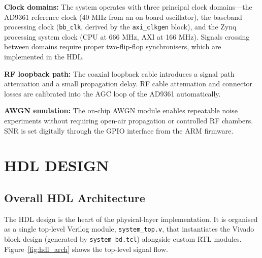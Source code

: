\documentclass[12pt, a4paper, oneside]{report}
\begin{document}
\textbf{Clock domains:} The system operates with three principal clock domains—the AD9361 reference clock (40 MHz from an on-board oscillator), the baseband processing clock (\texttt{bb\_clk}, derived by the \texttt{axi\_clkgen} block), and the Zynq processing system clock (CPU at 666 MHz, AXI at 166 MHz). Signals crossing between domains require proper two-flip-flop synchronisers, which are implemented in the HDL.

\textbf{RF loopback path:} The coaxial loopback cable introduces a signal path attenuation and a small propagation delay. RF cable attenuation and connector losses are calibrated into the AGC loop of the AD9361 automatically.

\textbf{AWGN emulation:} The on-chip AWGN module enables repeatable noise experiments without requiring open-air propagation or controlled RF chambers. SNR is set digitally through the GPIO interface from the ARM firmware.

\chapter{HDL DESIGN}

\section{Overall HDL Architecture}

The HDL design is the heart of the physical-layer implementation. It is organised as a single top-level Verilog module, \texttt{system\_top.v}, that instantiates the Vivado block design (generated by \texttt{system\_bd.tcl}) alongside custom RTL modules. Figure~\ref{fig:hdl_arch} shows the top-level signal flow.
\end{document}
